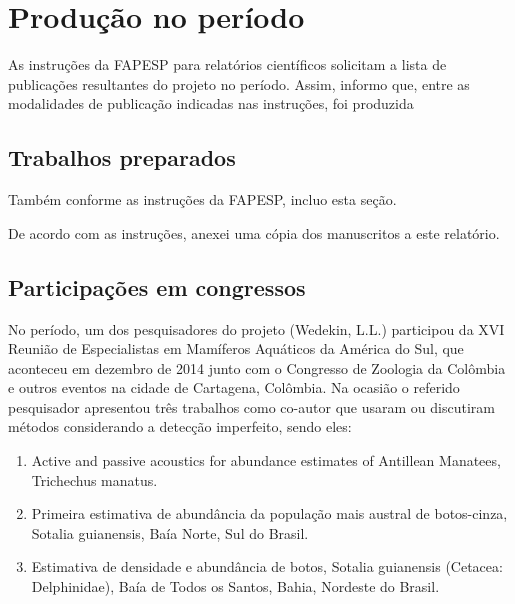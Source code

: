 \section{Produção no período} %
As instruções da FAPESP para relatórios científicos solicitam a lista de publicações resultantes do projeto no período.
Assim, informo que, entre as modalidades de publicação indicadas nas instruções, foi produzida 


\subsection{Trabalhos preparados} %
Também conforme as instruções da FAPESP, incluo esta seção. 


De acordo com as instruções, anexei uma cópia dos manuscritos a este relatório.

\subsection{Participações em congressos} %

No período, um dos pesquisadores do projeto (Wedekin, L.L.) participou da XVI Reunião de Especialistas em Mamíferos Aquáticos da América do Sul, que aconteceu em dezembro de 2014 junto com o Congresso de Zoologia da Colômbia e outros eventos na cidade de Cartagena, Colômbia. Na ocasião o referido pesquisador apresentou três trabalhos como co-autor que usaram ou discutiram métodos considerando a detecção imperfeito, sendo eles:

\begin{enumerate}
\item Active and passive acoustics for abundance estimates of Antillean Manatees, Trichechus manatus.
\item Primeira estimativa de abundância da população mais austral de botos-cinza, Sotalia guianensis, Baía Norte, Sul do Brasil.
\item Estimativa de densidade e abundância de botos, Sotalia guianensis (Cetacea: Delphinidae), Baía de Todos os Santos, Bahia, Nordeste do Brasil.
\end{enumerate}

